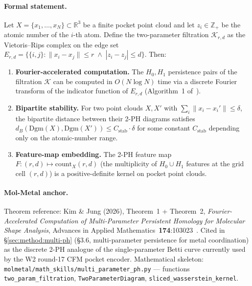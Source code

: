 \paragraph{Formal statement.}
\begin{theorem}
\label{thm:T5-multi-ph}
Let $X = \{x_1, \ldots, x_N\} \subset \mathbb{R}^3$ be a finite
pocket point cloud and let $z_i \in \mathbb{Z}_+$ be the atomic
number of the $i$-th atom.  Define the two-parameter filtration
$\mathcal{K}_{r, d}$ as the Vietoris--Rips complex on the edge set
$E_{r, d} = \{ \{i, j\} : \|x_i - x_j\| \le r \;\wedge\; |z_i - z_j|
\le d \}$.  Then:
\begin{enumerate}
  \item[(i)] \textbf{Fourier-accelerated computation.}  The
    $H_0, H_1$ persistence pairs of the filtration $\mathcal{K}$ can
    be computed in $O(N \log N)$ time via a discrete Fourier
    transform of the indicator function of $E_{r, d}$ (Algorithm~1
    of~\cite{kim_jung2026multi_ph}).
  \item[(ii)] \textbf{Bipartite stability.}  For two point clouds
    $X, X'$ with $\sum_i \|x_i - x_i'\| \le \delta$, the bipartite
    distance between their 2-PH diagrams satisfies
    $d_B(\mathrm{Dgm}(X), \mathrm{Dgm}(X')) \le C_{\mathrm{stab}}
    \cdot \delta$ for some constant $C_{\mathrm{stab}}$ depending
    only on the atomic-number range.
  \item[(iii)] \textbf{Feature-map embedding.}  The 2-PH feature
    map $F : (r, d) \mapsto \mathrm{count}_X(r, d)$ (the
    multiplicity of $H_0 \cup H_1$ features at the grid cell
    $(r, d)$) is a positive-definite kernel on pocket point
    clouds.
\end{enumerate}
\end{theorem}

\paragraph{Mol-Metal anchor.}
Theorem reference: Kim \& Jung (2026), Theorem~1 + Theorem~2,
\emph{Fourier-Accelerated Computation of Multi-Parameter
Persistent Homology for Molecular Shape Analysis}, Advances in
Applied Mathematics~\textbf{174}:103023~\cite{kim_jung2026multi_ph}.
Cited in \S\ref{sec:method:multi-ph} (\S3.6, multi-parameter
persistence for metal coordination) as the discrete 2-PH analogue
of the single-parameter Betti curve currently used by the W2
round-17 CFM pocket encoder.  Mathematical skeleton:
\texttt{molmetal/math\_skills/multi\_parameter\_ph.py} ---
functions \texttt{two\_param\_filtration},
\texttt{TwoParameterDiagram}, \texttt{sliced\_wasserstein\_kernel}.

